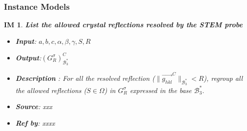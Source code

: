 \documentclass[12pt]{article}
\newcommand\norm[1]{\lVert#1\rVert}
\newtheorem{IM}{IM}
\begin{document}
\subsubsection{Instance Models} \label{sec_instance}    

\renewcommand{\labelitemi}{$-$}

\begin{IM}
\label{IM_1}
\noindent\colorbox{shadecolorIM}{\normalfont \textbf{List the allowed crystal reflections resolved by the STEM probe}}
\normalfont
\begin{itemize}
\item \textbf{Input}: $a, b, c, \alpha, \beta, \gamma, S, R$
\item \textbf{Output}:$(G^{\sigma}_{R})^{C}_{\mathcal{B}_{3}^{*}}$
\item \textbf{Description} : For all the resolved reflection ($\norm{\overrightarrow{g_{hkl}}^{C}}_{\mathcal{B}_{3}^{*}} < R$), regroup all the allowed reflections ($S \in \Omega$) in $G^{\sigma}_{R}$ expressed in the base $\mathcal{B}_{3}^{*}$.
\item \textbf{Source}: xxx
\item \textbf{Ref by}: xxxx
\end{itemize}
\end{IM}
\end{document}
